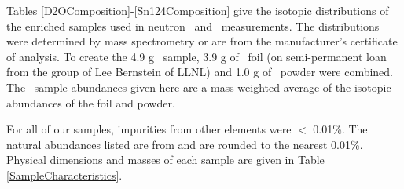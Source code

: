 \label{SampleComposition}
Tables \ref{D2OComposition}-\ref{Sn124Composition} give the isotopic
distributions of the 
enriched samples used in neutron \tot\ and \el\ measurements. The distributions
were determined by mass spectrometry or are from the manufacturer's certificate of analysis. 
To create the 4.9 g \snTwelve\ sample, 3.9 g of \snTwelve\ foil
(on semi-permanent loan from the group of Lee Bernstein of LLNL) and 1.0 g of
\snTwelve\ powder were combined. The
\snTwelve\ sample abundances given here are a mass-weighted average of the isotopic
abundances of the foil and powder.

For all of our samples, impurities from other elements were $<$ 0.01\%.
The natural abundances listed are from \cite{TICE1997} and are rounded to the nearest 0.01\%.
Physical dimensions and masses of each sample are given in Table \ref{SampleCharacteristics}.

